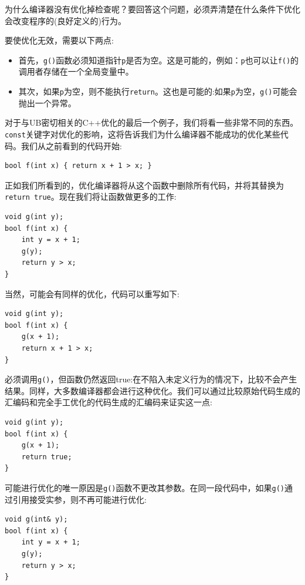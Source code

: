 为什么编译器没有优化掉检查呢？要回答这个问题，必须弄清楚在什么条件下优化会改变程序的(良好定义的)行为。

要使优化无效，需要以下两点:

\begin{itemize}
\item 
首先，\texttt{g()}函数必须知道指针\texttt{p}是否为空。这是可能的，例如：\texttt{p}也可以让\texttt{f()}的调用者存储在一个全局变量中。

\item 
其次，如果\texttt{p}为空，则不能执行\texttt{return}。这也是可能的:如果\texttt{p}为空，\texttt{g()}可能会抛出一个异常。
\end{itemize}

对于与UB密切相关的C++优化的最后一个例子，我们将看一些非常不同的东西。\texttt{const}关键字对优化的影响，这将告诉我们为什么编译器不能成功的优化某些代码。我们从之前看到的代码开始:

\begin{lstlisting}[style=styleCXX]
bool f(int x) { return x + 1 > x; }
\end{lstlisting}

正如我们所看到的，优化编译器将从这个函数中删除所有代码，并将其替换为\texttt{return true}。现在我们将让函数做更多的工作:

\begin{lstlisting}[style=styleCXX]
void g(int y);
bool f(int x) {
	int y = x + 1;
	g(y);
	return y > x;
}
\end{lstlisting}

当然，可能会有同样的优化，代码可以重写如下:

\begin{lstlisting}[style=styleCXX]
void g(int y);
bool f(int x) {
	g(x + 1);
	return x + 1 > x;
}
\end{lstlisting}

必须调用\texttt{g()}，但函数仍然返回true:在不陷入未定义行为的情况下，比较不会产生结果。同样，大多数编译器都会进行这种优化。我们可以通过比较原始代码生成的汇编码和完全手工优化的代码生成的汇编码来证实这一点:

\begin{lstlisting}[style=styleCXX]
void g(int y);
bool f(int x) {
	g(x + 1);
	return true;
}
\end{lstlisting}

可能进行优化的唯一原因是\texttt{g()}函数不更改其参数。在同一段代码中，如果\texttt{g()}通过引用接受实参，则不再可能进行优化:

\begin{lstlisting}[style=styleCXX]
void g(int& y);
bool f(int x) {
	int y = x + 1;
	g(y);
	return y > x;
}
\end{lstlisting}

